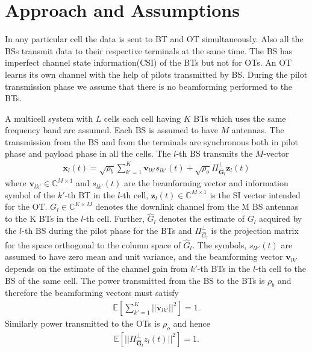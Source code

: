 \documentclass[10pt, a4paper, twoside,fleqn]{article}
\begin{document}
\section{Approach and Assumptions}	
	In any particular cell the data is sent to BT and OT simultaneously. Also all the BSs transmit data to their respective terminals at the same time. The BS has imperfect channel state information(CSI) of the BTs but not for OTs. An OT learns its own channel with the help of pilots transmitted by BS. During the pilot transmission phase we assume that there is no beamforming performed to the BTs.

	A multicell system with $L$ cells each cell having $K$ BTs which uses the same frequency band are assumed. Each BS is assumed to have $M$ antennas. The transmission from the BS and from the terminals are synchronous both in pilot phase and payload phase in all the cells. The $l$-th BS transmits the $M$-vector
\begin{eqnarray}\label{eqn:txbt}
	\pmb{x}_l(t) = \sqrt{\rho_b}\sum\limits_{k'=1}^{K}\boldsymbol{v}_{lk'}s_{lk'}(t)
    		      + \sqrt{\rho_o}\Pi^{\perp}_{{\pmb{\hat{G}}_l}}\pmb{z}_l(t)
\end{eqnarray}
where $\pmb{v}_{lk'}\in\mathbb{C}^{M\times 1}$ and $s_{lk'}(t)$ are the beamforming vector and information symbol of the $k'$-th BT in the $l$-th cell, $\pmb{z}_l(t) \in \mathbb{C}^{M\times 1}$  is the SI vector intended for the OT. $G_l \in {\mathbb C}^{K \times M}$ denotes the downlink channel from the M BS antennas to the K BTs in the $l$-th cell. Further, ${\widehat G}_l$ denotes the estimate of $G_l$ acquired by the $l$-th BS during the pilot phase for the BTs and $\Pi^{\perp}_{{\hat{G}_l}}$ is the projection matrix for the space orthogonal to the column space of $\hat G_l$. The symbols, $s_{lk'}(t)$ are assumed to have zero mean and unit variance, and the beamforming vector $\pmb{v}_{lk'}$ depends on the estimate of the channel gain from $k'$-th BTs in the $l$-th cell to the BS of the same cell. 
The power transmitted from the BS to the BTs is $\rho_b$ and therefore the beamforming vectors must satisfy
\begin{eqnarray}\label{eqn:vkcondtion}
	\mathbb{E}\left[\sum\limits_{k'=1}^{K}||\pmb{v}_{lk'}||^2\right]=1.
\end{eqnarray}
Similarly power transmitted to the OTs is $\rho_o$ and hence
\begin{eqnarray}\label{eqn:zlcondition}
	\mathbb{E}\left[||\Pi^{\perp}_{\pmb{\hat{G}}_l}z_l(t)||^2\right]=1.
\end{eqnarray}
\end{document}

